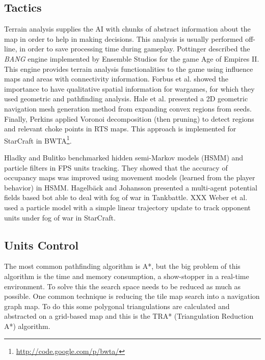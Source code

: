 \documentclass[journal]{IEEEtran}
\begin{document}

\subsection{Tactics}
Terrain analysis supplies the AI with chunks of abstract information about the map in order to help in making decisions. This analysis is usually performed off-line, in order to save processing time during gameplay. Pottinger \cite{Pottinger00} described the \emph{BANG} engine implemented by Ensemble Studios for the game Age of Empires II. This engine provides terrain analysis functionalities to the game using influence maps and areas with connectivity information. Forbus et al. \cite{Forbus2002} showed the importance to have qualitative spatial information for wargames, for which they used geometric and pathfinding analysis. Hale et al. \cite{Hale08} presented a 2D geometric navigation mesh generation method from expanding convex regions from seeds. Finally, Perkins \cite{Perkins10} applied Voronoi decomposition (then pruning) %
to detect regions and relevant choke points in RTS maps. This approach is implemented for StarCraft in BWTA\footnote{\url{http://code.google.com/p/bwta/}}.

Hladky and Bulitko \cite{Hladky2008} benchmarked hidden semi-Markov models (HSMM) and particle filters in FPS units tracking. They showed that the accuracy of occupancy maps was improved using movement models (learned from the player behavior) in HSMM. 
Hagelb\"{a}ck and Johansson \cite{HagelbackJ08} presented a multi-agent potential fields based bot able to deal with fog of war in Tankbattle. XXX 
Weber et al. \cite{WeberAIIDE11} used a particle model with a simple linear trajectory update to track opponent units under fog of war in StarCraft.


\subsection{Units Control}

The most common pathfinding algorithm is A*, but the big problem of this algorithm is the time and  memory consumption, a show-stopper in a real-time environment.
To solve this the search space needs to be reduced as much as possible. One common technique is reducing the tile map search into a navigation graph map. To do this some polygonal triangulations are calculated and abstracted on a grid-based map and this is the TRA* (Triangulation Reduction A*) algorithm\cite{Demyen_2006}. 
\end{document}
